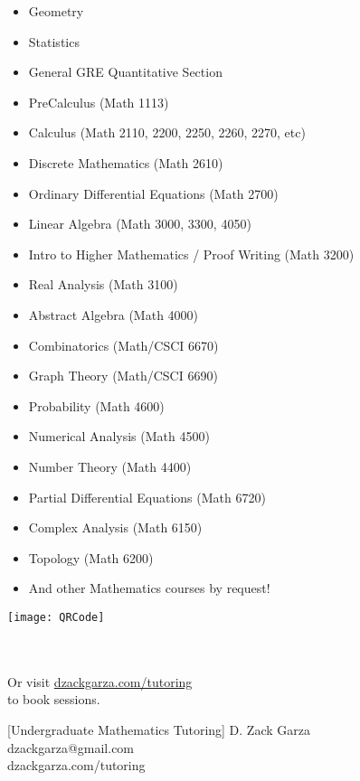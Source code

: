 \begin{minipage}{.7\linewidth}
\begin{itemize}
  \item Geometry
  \item Statistics
  \item General GRE Quantitative Section
  \item PreCalculus \hfill (Math 1113)
  \item Calculus \hfill (Math 2110, 2200, 2250, 2260, 2270, etc)
  \item Discrete Mathematics \hfill (Math 2610)
  \item Ordinary Differential Equations \hfill (Math 2700)
  \item Linear Algebra \hfill (Math 3000, 3300, 4050)
  \item Intro to Higher Mathematics / Proof Writing \hfill (Math 3200)
  \item Real Analysis \hfill (Math 3100)
  \item Abstract Algebra \hfill (Math 4000)
  \item Combinatorics \hfill (Math/CSCI 6670)
  \item Graph Theory \hfill (Math/CSCI 6690)
  \item Probability \hfill (Math 4600)
  \item Numerical Analysis \hfill (Math 4500)
  \item Number Theory \hfill (Math 4400)
  \item Partial Differential Equations \hfill (Math 6720)
  \item Complex Analysis \hfill (Math 6150)
  \item Topology \hfill (Math 6200)
  \item And other Mathematics courses by request!
\end{itemize}
\end{minipage}
\hfill
\begin{minipage}{.3\linewidth}
  \centering
  \texttt{[image: QRCode]}
  \caption{\\ \\ Or visit \underline{dzackgarza.com/tutoring} \\ to book sessions.}
\end{minipage}

\hrulefill

\stubs[10]{5cm}[Undergraduate Mathematics Tutoring]{
  \faUser\quad D. Zack Garza \\
  \faEnvelopeO\quad dzackgarza@gmail.com \\
  \faGlobe\quad dzackgarza.com/tutoring
}


